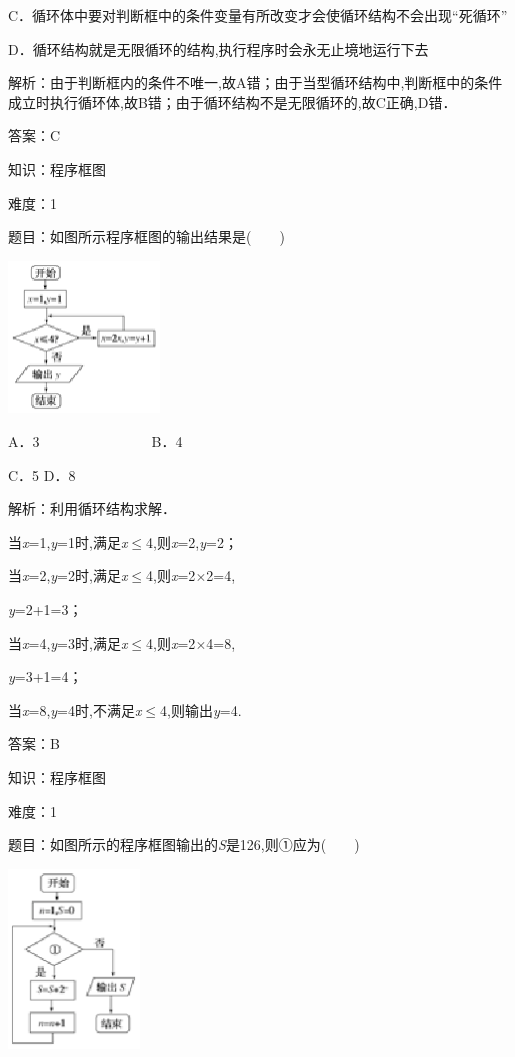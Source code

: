 \documentclass{article} %
\begin{document}
C．循环体中要对判断框中的条件变量有所改变才会使循环结构不会出现``死循环''

D．循环结构就是无限循环的结构,执行程序时会永无止境地运行下去

解析：由于判断框内的条件不唯一,故A错；由于当型循环结构中,判断框中的条件成立时执行循环体,故B错；由于循环结构不是无限循环的,故C正确,D错．

答案：C

知识：程序框图

难度：1

题目：如图所示程序框图的输出结果是(　　)

\includegraphics*[width=1.58in, height=1.59in, keepaspectratio=false]{image15}

A．3　　　　　　　　B．4

C．5  D．8

解析：利用循环结构求解．

当\textit{x}=1,\textit{y}=1时,满足\textit{x}$\mathrm{\le}$4,则\textit{x}=2,\textit{y}=2；

当\textit{x}=2,\textit{y}=2时,满足\textit{x}$\mathrm{\le}$4,则\textit{x}=2$\mathrm{\times}$2=4,

\textit{y}=2+1=3；

当\textit{x}=4,\textit{y}=3时,满足\textit{x}$\mathrm{\le}$4,则\textit{x}=2$\mathrm{\times}$4=8,

\textit{y}=3+1=4；

当\textit{x}=8,\textit{y}=4时,不满足\textit{x}$\mathrm{\le}$4,则输出\textit{y}=4.

答案：B

知识：程序框图

难度：1

题目：如图所示的程序框图输出的\textit{S}是126,则①应为(　　)

\includegraphics*[width=1.38in, height=1.88in, keepaspectratio=false]{image16}
\end{document}
